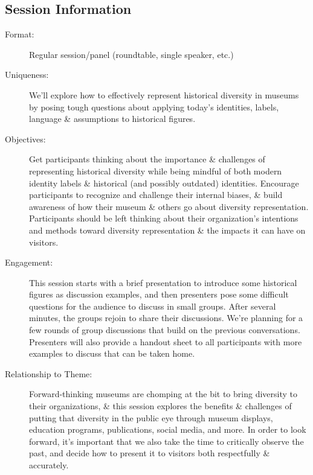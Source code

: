 \documentclass{report}
\begin{document}
              \subsection*{Session Information}
                \begin{description}
                  \item [Format:] Regular session/panel (roundtable, single speaker, etc.)
							    
							    \item [Uniqueness:]We’ll explore how to effectively represent historical diversity in museums by posing tough questions about applying today’s identities, labels, language & assumptions to historical figures.
							    \item [Objectives:]Get participants thinking about the importance \& challenges of representing historical diversity while being mindful of both modern identity labels \& historical (and possibly outdated) identities.
Encourage participants to recognize and challenge their internal biases, \& build awareness of how their museum \& others go about diversity representation. Participants should be left thinking about their organization’s intentions and methods toward diversity representation \& the impacts it can have on visitors.
							    \item [Engagement:]This session starts with a brief presentation to introduce some historical figures as discussion examples, and then presenters pose some difficult questions for the audience to discuss in small groups. After several minutes, the groups rejoin to share their discussions. We’re planning for a few rounds of group discussions that build on the previous conversations. Presenters will also provide a handout sheet to all participants with more examples to discuss that can be taken home.
							    \item [Relationship to Theme:]Forward-thinking museums are chomping at the bit to bring diversity to their organizations, \& this session explores the benefits \& challenges of putting that diversity in the public eye through museum displays, education programs, publications, social media, and more. In order to look forward, it’s important that we also take the time to critically observe the past, and decide how to present it to visitors both respectfully \& accurately.
							    
                \end{description}
\end{document}
